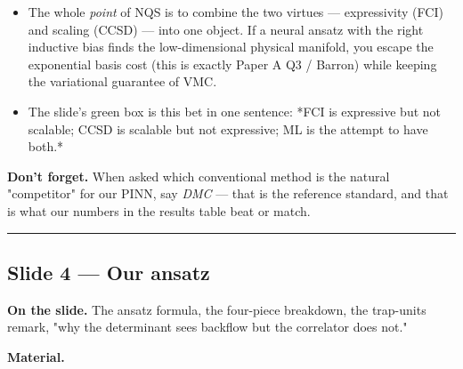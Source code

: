 \documentclass[11pt]{article}
\begin{document}
\begin{itemize}
\item The whole \emph{point} of NQS is to combine the two virtues --- expressivity (FCI)
and scaling (CCSD) --- into one object. If a neural ansatz with the right
inductive bias finds the low-dimensional physical manifold, you escape the
exponential basis cost (this is exactly Paper A Q3 / Barron) while keeping
the variational guarantee of VMC.
\item The slide's green box is this bet in one sentence: *FCI is expressive but
not scalable; CCSD is scalable but not expressive; ML is the attempt to
have both.*
\end{itemize}
\textbf{Don't forget.} When asked which conventional method is the natural
"competitor" for our PINN, say \emph{DMC} --- that is the reference standard, and
that is what our numbers in the results table beat or match.

\vspace{4pt}\hrule\vspace{8pt}

\subsection*{Slide 4 --- Our ansatz}

\textbf{On the slide.} The ansatz formula, the four-piece breakdown, the trap-units
remark, "why the determinant sees backflow but the correlator does not."

\textbf{Material.}
\end{document}
